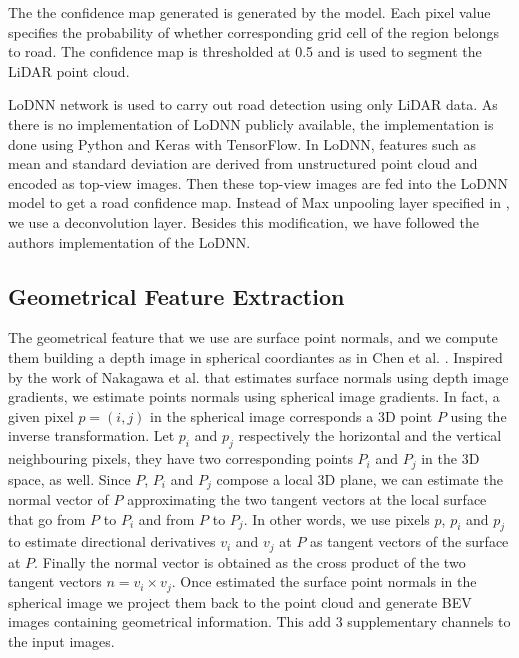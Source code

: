 \documentclass[10pt,twocolumn,letterpaper]{article}
\begin{document}
The the confidence map generated is generated by the model. Each pixel value specifies the probability of whether corresponding grid cell of the region belongs to road. The confidence map is thresholded at 0.5 and is used to segment the LiDAR point cloud.

LoDNN network is used to carry out road detection using only LiDAR data. As there is no implementation of LoDNN publicly available, the implementation is done using Python and Keras with TensorFlow. In LoDNN, features such as mean and standard deviation are derived from unstructured point cloud and encoded as top-view images. Then these top-view images are fed into the LoDNN model to get a road confidence map. Instead of Max unpooling layer specified in \cite{lodnn2017}, we use a deconvolution layer. Besides this modification, we have followed the authors implementation of the LoDNN.

\subsection{Geometrical Feature Extraction}
The geometrical feature that we use are surface point normals, and we compute them 
building a depth image in spherical coordiantes as in Chen et al. \cite{chen2017lidar}. Inspired by the work of Nakagawa et al. \cite{nakagawa2015estimating} that estimates surface normals using depth image gradients, we estimate points normals using spherical image gradients.
In fact, a given pixel $p = (i,j)$ in the spherical image corresponds a $3$D point $P$ using the inverse transformation. Let $p_i$ and $p_j$ respectively the horizontal and the vertical neighbouring pixels, they have two corresponding points $P_i$ and $P_j$ in the $3$D space, as well. Since $P$, $P_i$ and $P_j$ compose a local $3$D plane, we can estimate the normal vector of $P$ approximating the two tangent vectors at the local surface that go from $P$ to $P_i$ and from $P$ to $P_j$. In other words, we use pixels $p$, $p_i$ and $p_j$ to estimate directional derivatives $v_i$ and $v_j$  at $P$ as tangent vectors of the surface at $P$. Finally the normal vector is obtained as the cross product of the two tangent vectors $ n = v_i \times v_j$. 
Once estimated the surface point normals in the spherical image we project them back to the point cloud and generate BEV images containing geometrical information. This add $3$ supplementary channels to the input images.  
\end{document}
